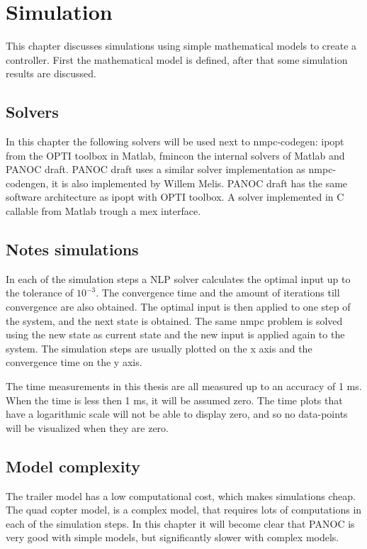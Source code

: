 \chapter{Simulation}
This chapter discusses simulations using simple mathematical models to create a controller. First the mathematical model is defined, after that some simulation results are discussed.

\section{Solvers}
In this chapter the following solvers will be used next to nmpc-codegen: ipopt from the OPTI toolbox in Matlab, fmincon the internal solvers of Matlab and PANOC draft. PANOC draft uses a similar solver implementation as nmpc-codengen, it is also implemented by Willem Melis. PANOC draft has the same software architecture as ipopt with OPTI toolbox. A solver implemented in C callable from Matlab trough a mex interface.

\section{Notes simulations}
In each of the simulation steps a NLP solver calculates the optimal input up to the tolerance of $10^{-3}$. The convergence time and the amount of iterations till convergence are also obtained. The optimal input is then applied to one step of the system, and the next state is obtained. The same nmpc problem is solved using the new state as current state  and the new input is applied again to the system. The simulation steps are usually plotted on the x axis and the convergence time on the y axis.

The time measurements in this thesis are all measured up to an accuracy of 1 ms. When the time is less then 1 ms, it will be assumed zero. The time plots that have a logarithmic scale will not be able to display zero, and so no data-points will be visualized when they are zero.

\section{Model complexity}
The trailer model has a low computational cost, which makes simulations cheap. The quad copter model, is a complex model, that requires lots of computations in each of the simulation steps. In this chapter it will become clear that PANOC is very good with simple models, but significantly slower with complex models.

